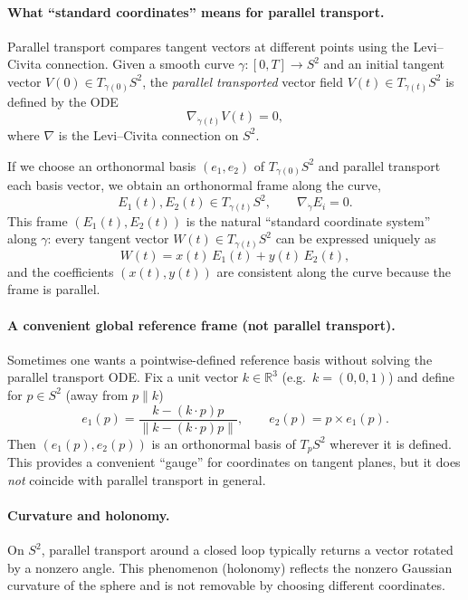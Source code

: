 \documentclass[12pt,a4paper]{article}
\theoremstyle{plain}
\theoremstyle{definition}      %
\begin{document}
	\paragraph{What ``standard coordinates'' means for parallel transport.}
	Parallel transport compares tangent vectors at different points using the Levi--Civita connection.
	Given a smooth curve $\gamma:[0,T]\to S^2$ and an initial tangent vector $V(0)\in T_{\gamma(0)}S^2$,
	the \emph{parallel transported} vector field $V(t)\in T_{\gamma(t)}S^2$ is defined by the ODE
	\[
	\nabla_{\dot\gamma(t)}V(t)=0,
	\]
	where $\nabla$ is the Levi--Civita connection on $S^2$.
	
	If we choose an orthonormal basis $(e_1,e_2)$ of $T_{\gamma(0)}S^2$ and parallel transport each basis vector,
	we obtain an orthonormal frame along the curve,
	\[
	E_1(t),E_2(t)\in T_{\gamma(t)}S^2,\qquad \nabla_{\dot\gamma}E_i=0.
	\]
	This frame $(E_1(t),E_2(t))$ is the natural ``standard coordinate system'' along $\gamma$:
	every tangent vector $W(t)\in T_{\gamma(t)}S^2$ can be expressed uniquely as
	\[
	W(t)=x(t)\,E_1(t)+y(t)\,E_2(t),
	\]
	and the coefficients $(x(t),y(t))$ are consistent along the curve because the frame is parallel.
	
	\paragraph{A convenient global reference frame (not parallel transport).}
	Sometimes one wants a pointwise-defined reference basis without solving the parallel transport ODE.
	Fix a unit vector $k\in\mathbb{R}^3$ (e.g.\ $k=(0,0,1)$) and define for $p\in S^2$ (away from $p\parallel k$)
	\[
	e_1(p)=\frac{k-(k\cdot p)p}{\|k-(k\cdot p)p\|},\qquad e_2(p)=p\times e_1(p).
	\]
	Then $(e_1(p),e_2(p))$ is an orthonormal basis of $T_pS^2$ wherever it is defined.
	This provides a convenient ``gauge'' for coordinates on tangent planes, but it does \emph{not} coincide with
	parallel transport in general.
	
	\paragraph{Curvature and holonomy.}
	On $S^2$, parallel transport around a closed loop typically returns a vector rotated by a nonzero angle.
	This phenomenon (holonomy) reflects the nonzero Gaussian curvature of the sphere and is not removable by choosing
	different coordinates.
	
	
\end{document}
